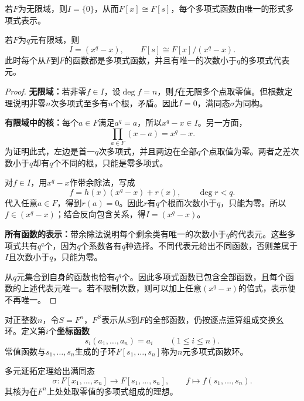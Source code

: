 \begin{theorem}\label{p2:poly-functions-one}
若$F$为无限域，则$I=\{0\}$，从而$F[x]\cong F[s]$，每个多项式函数由唯一的形式多项式表示。

若$F$为$q$元有限域，则
\[
I=(x^q-x),\qquad F[s]\cong F[x]/(x^q-x).
\]
此时每个从$F$到$F$的函数都是多项式函数，并且有唯一的次数小于$q$的多项式代表元。
\end{theorem}
\begin{proof}
\textbf{无限域：}若非零$f\in I$，设$\deg f=n$，则$f$在无限多个点取零值。但根数定理说明非零$n$次多项式至多有$n$个根，矛盾。因此$I=0$，满同态$\sigma$为同构。

\textbf{有限域中的核：}每个$a\in F$满足$a^q=a$，所以$x^q-x\in I$。另一方面，
\[
\prod_{a\in F}(x-a)=x^q-x.
\]
为证明此式，左边是首一$q$次多项式，并且两边在全部$q$个点取值为零。两者之差次数小于$q$却有$q$个不同的根，只能是零多项式。

对$f\in I$，用$x^q-x$作带余除法，写成
\[
f=h(x)(x^q-x)+r(x),\qquad\deg r<q.
\]
代入任意$a\in F$，得到$r(a)=0$。因此$r$有$q$个根而次数小于$q$，只能为零。所以$f\in(x^q-x)$；结合反向包含关系，得$I=(x^q-x)$。

\textbf{所有函数的表示：}带余除法说明每个剩余类有唯一的次数小于$q$的代表元。这些多项式共有$q^q$个，因为$q$个系数各有$q$种选择。不同代表元给出不同函数，否则差属于$I$且次数小于$q$，只能为零。

从$q$元集合到自身的函数也恰有$q^q$个。因此多项式函数已包含全部函数，且每个函数的上述代表元唯一。若不限制次数，则可以加上任意$(x^q-x)$的倍式，表示便不再唯一。
\end{proof}

\begin{definition}
对正整数$n$，令$S=F^n$，$F^S$表示从$S$到$F$的全部函数，仍按逐点运算组成交换幺环。定义第$i$个\textbf{坐标函数}
\[
s_i(a_1,\ldots,a_n)=a_i\qquad(1\le i\le n).
\]
常值函数与$s_1,\ldots,s_n$生成的子环$F[s_1,\ldots,s_n]$称为$n$元多项式函数环。
\end{definition}

多元延拓定理给出满同态
\[
\sigma:F[x_1,\ldots,x_n]\to F[s_1,\ldots,s_n],
\qquad f\longmapsto f(s_1,\ldots,s_n).
\]
其核为在$F^n$上处处取零值的多项式组成的理想。

